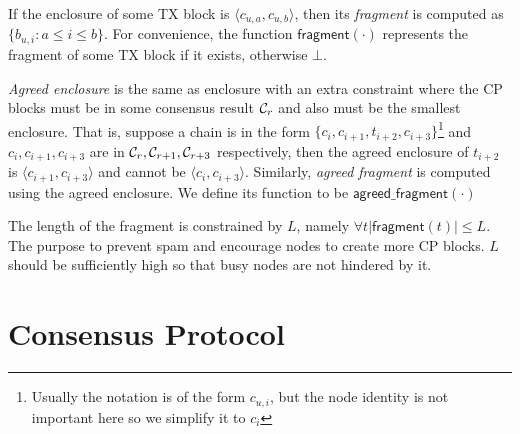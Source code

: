 If the enclosure of some TX block is $\langle c_{u,a}, c_{u, b} \rangle$,
then its \emph{fragment} is computed as $\{ b_{u, i} : a \le i \le b \}$.
For convenience, the function $\textsf{fragment}(\cdot)$ represents the fragment of some TX block if it exists, otherwise $\bot$.

\emph{Agreed enclosure} is the same as enclosure with an extra constraint where the CP blocks must be in some consensus result $\mathcal{C}_r$ and also must be the smallest enclosure.
That is, suppose a chain is in the form
    $\{c_{i}, c_{i+1}, t_{i+2}, c_{i+3}\}$\footnote{Usually the notation is of the form $c_{u, i}$, but the node identity is not important here so we simplify it to $c_{i}$}
    and $c_{i}, c_{i+1}, c_{i+3}$ are in $\mathcal{C}_r, \mathcal{C}_{r+1}, \mathcal{C}_{r+3}$ respectively,
    then the agreed enclosure of $t_{i+2}$ is $\langle c_{i+1}, c_{i+3}\rangle$ and cannot be $\langle c_{i}, c_{i+3}\rangle$.
Similarly, \emph{agreed fragment} is computed using the agreed enclosure.
We define its function to be $\textsf{agreed\_fragment}(\cdot)$

The length of the fragment is constrained by $L$,
namely $\forall t |\textsf{fragment}(t)| \le L$.
The purpose to prevent spam and encourage nodes to create more CP blocks.
$L$ should be sufficiently high so that busy nodes are not hindered by it.


\section{Consensus Protocol}
\label{sec:cons-protocol}

